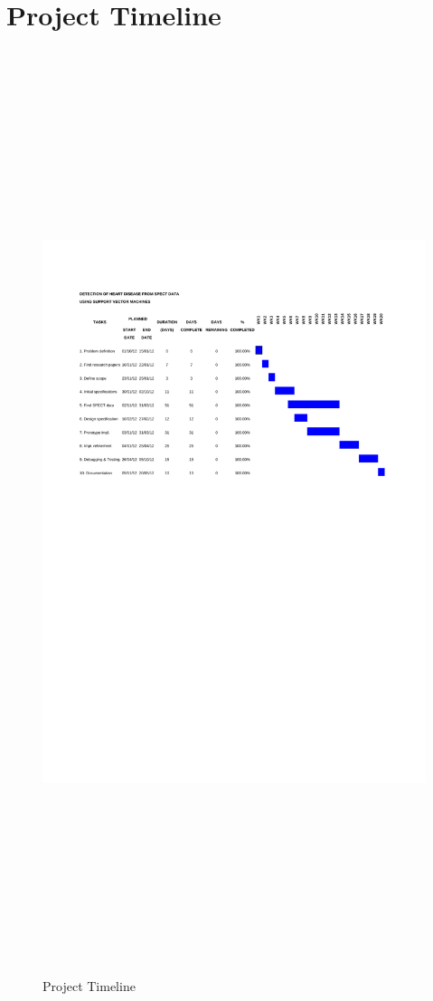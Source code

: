 \documentclass[11pt,a4paper]{report}
\begin{document}
{\section{Project Timeline}    

\begin{figure}[H]
\centerline{\includegraphics[width=16cm, height=27cm]{gantt.pdf}}
\vspace{-13cm}
\caption{Project Timeline}
\end{figure}

}
\end{document}
